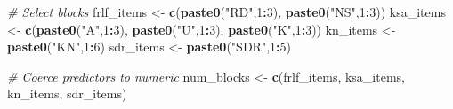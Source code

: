 \documentclass[
  10pt,
]{article}
\newenvironment{Shaded}{\begin{snugshade}}{\end{snugshade}}
\newcommand{\CommentTok}[1]{\textcolor[rgb]{0.56,0.35,0.01}{\textit{#1}}}
\newcommand{\DecValTok}[1]{\textcolor[rgb]{0.00,0.00,0.81}{#1}}
\newcommand{\FunctionTok}[1]{\textcolor[rgb]{0.13,0.29,0.53}{\textbf{#1}}}
\newcommand{\NormalTok}[1]{#1}
\newcommand{\OtherTok}[1]{\textcolor[rgb]{0.56,0.35,0.01}{#1}}
\newcommand{\SpecialCharTok}[1]{\textcolor[rgb]{0.81,0.36,0.00}{\textbf{#1}}}
\newcommand{\StringTok}[1]{\textcolor[rgb]{0.31,0.60,0.02}{#1}}
\begin{document}
\begin{Shaded}
\begin{Highlighting}[]
\CommentTok{\# Select blocks}
\NormalTok{frlf\_items }\OtherTok{\textless{}{-}} \FunctionTok{c}\NormalTok{(}\FunctionTok{paste0}\NormalTok{(}\StringTok{"RD"}\NormalTok{,}\DecValTok{1}\SpecialCharTok{:}\DecValTok{3}\NormalTok{), }\FunctionTok{paste0}\NormalTok{(}\StringTok{"NS"}\NormalTok{,}\DecValTok{1}\SpecialCharTok{:}\DecValTok{3}\NormalTok{))}
\NormalTok{ksa\_items  }\OtherTok{\textless{}{-}} \FunctionTok{c}\NormalTok{(}\FunctionTok{paste0}\NormalTok{(}\StringTok{"A"}\NormalTok{,}\DecValTok{1}\SpecialCharTok{:}\DecValTok{3}\NormalTok{), }\FunctionTok{paste0}\NormalTok{(}\StringTok{"U"}\NormalTok{,}\DecValTok{1}\SpecialCharTok{:}\DecValTok{3}\NormalTok{), }\FunctionTok{paste0}\NormalTok{(}\StringTok{"K"}\NormalTok{,}\DecValTok{1}\SpecialCharTok{:}\DecValTok{3}\NormalTok{))}
\NormalTok{kn\_items   }\OtherTok{\textless{}{-}} \FunctionTok{paste0}\NormalTok{(}\StringTok{"KN"}\NormalTok{,}\DecValTok{1}\SpecialCharTok{:}\DecValTok{6}\NormalTok{)}
\NormalTok{sdr\_items  }\OtherTok{\textless{}{-}} \FunctionTok{paste0}\NormalTok{(}\StringTok{"SDR"}\NormalTok{,}\DecValTok{1}\SpecialCharTok{:}\DecValTok{5}\NormalTok{)}

\CommentTok{\# Coerce predictors to numeric}
\NormalTok{num\_blocks }\OtherTok{\textless{}{-}} \FunctionTok{c}\NormalTok{(frlf\_items, ksa\_items, kn\_items, sdr\_items)}


\end{Highlighting}
\end{Shaded}
\end{document}
